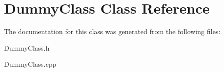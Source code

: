 \hypertarget{class_dummy_class}{}\section{Dummy\+Class Class Reference}
\label{class_dummy_class}


The documentation for this class was generated from the following files\+:\begin{DoxyCompactItemize}
\item 
Dummy\+Class.\+h\item 
Dummy\+Class.\+cpp\end{DoxyCompactItemize}
